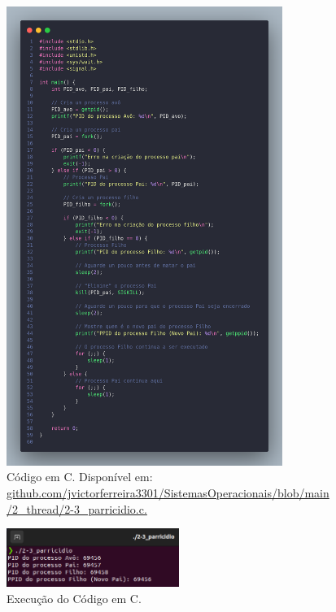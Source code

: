 \documentclass[
	12pt,				%
	openright,			%
	oneside,			%
	a4paper,			%
	chapter=TITLE,		%
	english,			%
	french,				%
	spanish,			%
	brazil				%
	]{abntex2}
\theoremstyle{definition}
\begin{document}
\begin{figure}
    \centering
    \includegraphics[width=0.8\textwidth]{imagens/processos_3.png}
    \caption{Código em C. Disponível em: \href{https://github.com/jvictorferreira3301/Sistemas_Operacionais/blob/main/2_thread/2-3_parricidio.c}{github.com/jvictorferreira3301/SistemasOperacionais/blob/main
    /2\_thread/2-3\_parricidio.c.}} 
    \label{fig:processos3}
\end{figure}

\begin{figure}
    \centering
    \includegraphics[width=0.5\textwidth]{imagens/run_processos_3.png}
    \caption{Execução do Código em C.}
    \label{fig:run3}
\end{figure}
\end{document}
